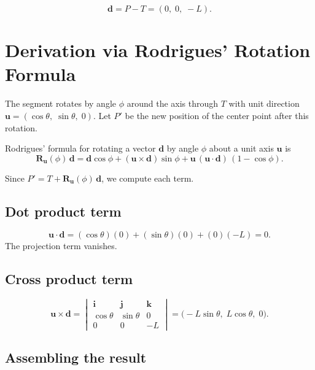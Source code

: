 \documentclass[12pt,a4paper]{article}
\begin{document}
\begin{equation}\label{eq:d}
  \mathbf{d} = P - T = (0,\; 0,\; -L).
\end{equation}

\section{Derivation via Rodrigues' Rotation Formula}

The segment rotates by angle $\phi$ around the axis through $T$ with unit
direction $\mathbf{u} = (\cos\theta,\; \sin\theta,\; 0)$.
Let $P'$ be the new position of the center point after this rotation.

Rodrigues' formula for rotating a vector $\mathbf{d}$ by angle $\phi$ about a
unit axis $\mathbf{u}$ is
\begin{equation}\label{eq:rodrigues}
  \mathbf{R}_{\mathbf{u}}(\phi)\, \mathbf{d}
  = \mathbf{d}\cos\phi
    + (\mathbf{u}\times\mathbf{d})\sin\phi
    + \mathbf{u}\,(\mathbf{u}\cdot\mathbf{d})\,(1-\cos\phi).
\end{equation}

Since $P' = T + \mathbf{R}_{\mathbf{u}}(\phi)\,\mathbf{d}$,
we compute each term.

\subsection{Dot product term}

\[
  \mathbf{u}\cdot\mathbf{d} = (\cos\theta)(0) + (\sin\theta)(0) + (0)(-L) = 0.
\]
The projection term vanishes.

\subsection{Cross product term}

\[
\mathbf{u}\times\mathbf{d}
= \begin{vmatrix}
    \mathbf{i} & \mathbf{j} & \mathbf{k} \\
    \cos\theta & \sin\theta & 0 \\
    0 & 0 & -L
  \end{vmatrix}
= \big( -L\sin\theta,\; L\cos\theta,\; 0 \big).
\]

\subsection{Assembling the result}
\end{document}
